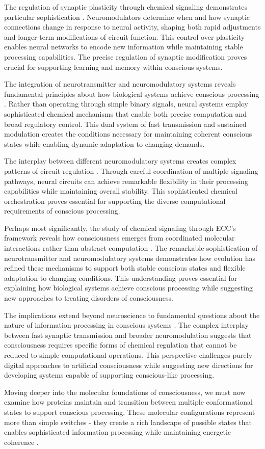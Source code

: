 The regulation of synaptic plasticity through chemical signaling demonstrates particular sophistication \cite{Froemke2015}. Neuromodulators determine when and how synaptic connections change in response to neural activity, shaping both rapid adjustments and longer-term modifications of circuit function. This control over plasticity enables neural networks to encode new information while maintaining stable processing capabilities. The precise regulation of synaptic modification proves crucial for supporting learning and memory within conscious systems.

The integration of neurotransmitter and neuromodulatory systems reveals fundamental principles about how biological systems achieve conscious processing \cite{Picciotto2012}. Rather than operating through simple binary signals, neural systems employ sophisticated chemical mechanisms that enable both precise computation and broad regulatory control. This dual system of fast transmission and sustained modulation creates the conditions necessary for maintaining coherent conscious states while enabling dynamic adaptation to changing demands.

The interplay between different neuromodulatory systems creates complex patterns of circuit regulation \cite{Cools2011}. Through careful coordination of multiple signaling pathways, neural circuits can achieve remarkable flexibility in their processing capabilities while maintaining overall stability. This sophisticated chemical orchestration proves essential for supporting the diverse computational requirements of conscious processing.

Perhaps most significantly, the study of chemical signaling through ECC's framework reveals how consciousness emerges from coordinated molecular interactions rather than abstract computation \cite{Marder2012}. The remarkable sophistication of neurotransmitter and neuromodulatory systems demonstrates how evolution has refined these mechanisms to support both stable conscious states and flexible adaptation to changing conditions. This understanding proves essential for explaining how biological systems achieve conscious processing while suggesting new approaches to treating disorders of consciousness.

The implications extend beyond neuroscience to fundamental questions about the nature of information processing in conscious systems \cite{Dayan2012}. The complex interplay between fast synaptic transmission and broader neuromodulation suggests that consciousness requires specific forms of chemical regulation that cannot be reduced to simple computational operations. This perspective challenges purely digital approaches to artificial consciousness while suggesting new directions for developing systems capable of supporting conscious-like processing.

Moving deeper into the molecular foundations of consciousness, we must now examine how proteins maintain and transition between multiple conformational states to support conscious processing. These molecular configurations represent more than simple switches - they create a rich landscape of possible states that enables sophisticated information processing while maintaining energetic coherence \cite{Nadim2014}.